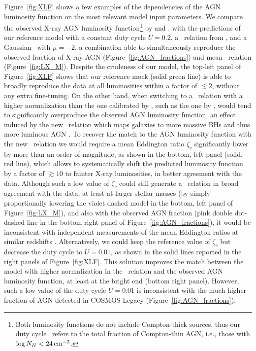 Figure~\ref{fig:XLF} shows a few examples of the dependencies of the AGN luminosity function
on the most relevant model input parameters. We compare the observed X-ray AGN luminosity
function\footnote{Both luminosity functions do not include Compton-thick sources, thus our
duty cycle \UMBHz\ refers to the total fraction of Compton-thin AGN, i.e., those with
$\log N_H<24\, {\rm cm^{-2}}$.} by \citet[][orange dotted lines]{2014ApJ...786..104U}
and \citet[][blue filled circles]{2015ApJ...804..104M}, with the predictions of our
reference model with a constant duty cycle $U=0.2$, a \MBHMS\ relation from
\citet{2015ApJ...813...82R}, and a Gaussian \PLz\ with $\mu=-2$, a combination able to
simultaneously reproduce the observed fraction of X-ray AGN (Figure~\ref{fig:AGN_fractions})
and mean \LXMS\ relation (Figure~\ref{fig:LX_M}). Despite the crudeness of our model, the
top-left panel of Figure~\ref{fig:XLF} shows that our reference mock (solid green line) is
able to broadly reproduce the data at all luminosities within a factor of $\lesssim 2$,
without any extra fine-tuning. On the other hand, when switching to a \MBHMS\ relation with
a higher normalization than the one calibrated by \citet{2015ApJ...813...82R}, such as the
one by \citet{2019ApJ...876..155S}, would tend to significantly overproduce the observed AGN
luminosity function, an effect induced by the new \MBHMS\ relation which maps galaxies to
more massive BHs and thus more luminous AGN \citep[e.g.,][]{ShankarNat}. To recover the match
to the AGN luminosity function with the new \MBHMS\ relation we would require a mean Eddington
ratio $\zeta_c$ significantly lower by more than an order of magnitude,
as shown in the bottom, left panel (solid, red line), which allows to systematically shift the predicted
luminosity function by a factor of $\gtrsim 10$ to fainter X-ray luminosities, in better
agreement with the data. Although such a low value of $\zeta_c$ could still generate a
\LXMS\ relation in broad agreement with the data, at least at larger stellar masses (by
simply proportionally lowering the violet dashed model in the bottom, left panel of
Figure~\ref{fig:LX_M}), and also with the observed AGN fraction (pink double dot-dashed
line in the bottom right panel of Figure~\ref{fig:AGN_fractions}), it would be inconsistent
with independent measurements of the mean Eddington ratios at similar redshifts
\citep[e.g.,][]{H09,Kauff09,2019MNRAS.484.4360A}. Alternatively, we could keep the reference
value of $\zeta_c$ but decrease the duty cycle to $U=0.01$, as shown in the solid lines
reported in the right panels of Figure~\ref{fig:XLF}. This solution improves the match between
the model with higher normalization in the \MBHMS\ relation and the observed AGN luminosity
function, at least at the bright end (bottom right panel). However, such a low value of the
duty cycle $U=0.01$ is inconsistent with the much higher fraction of AGN detected in
COSMOS-Legacy (Figure~\ref{fig:AGN_fractions}).

